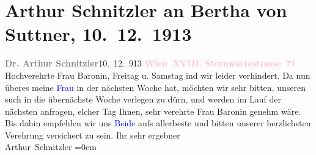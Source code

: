 

               \section[Arthur Schnitzler an Bertha von Suttner, 10. 12. 1913]{ Arthur Schnitzler an Bertha von Suttner,
                    10. 12. 1913}\nopagebreak{}\rehead{ }\normalsize\beginnumbering{} \toendnotes[C]{\smallbreak\pagebreak[2]} 
\toendnotes[C]{\smallbreak}\pstart
           \noindent{}{\pb}\textcolor{gray}{\textbf{Dr. Arthur Schnitzler}}\hfill 10. 12. 913\pend
           \pstart
           \textcolor{gray}{\textbf{\textcolor{pink}{Wien XVIII. Sternwartestrasse 71}{}\ledrightnote{\textcolor{pink}{Sternwartestraße}}}}\pend
           \pstart
           Hochverehrte Frau Baronin, Freitag u. Samstag{ }ind wir leider verhindert. Da nun überes meine \textcolor{blue}{Frau}{} in
                    der nächsten Woche \label{K_L02162_1v}\label{K_L02162_1h} hat, möchten wir sehr bitten, unseren such in die übernächste Woche verlegen zu dürn, und werden im Lauf der nächsten anfragen, elcher Tag Ihnen, sehr verehrte Frau Baronin {\pb}genehm wäre.\pend
           \pstart
           Bis dahin empfehlen wir uns \textcolor{blue}{Beide}{} aufs allerbeste und bitten unserer herzlichsten Verehrung
                    versichert zu sein.\pend
           \pstart
           Ihr sehr ergebner{\\[\baselineskip]}\spacefill\mbox{Arthur Schnitzler}\pend
           \leftskip=0em{}\endnumbering{}  
      